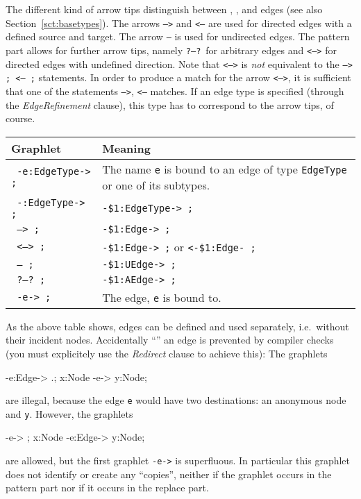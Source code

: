 The different kind of arrow tips distinguish between , , and  edges (see also Section~\ref{sct:basetypes}).
The arrows \texttt{-->} and \texttt{<--} are used for directed edges with a defined source and target.
The arrow \texttt{--} is used for undirected edges.
The pattern part allows for further arrow tips, namely \texttt{?--?}\ for arbitrary edges and \texttt{<-->} for directed edges with undefined direction.
Note that \texttt{<-->} is \emph{not} equivalent to the \texttt{--> ; <-- ;} statements.
In order to produce a match for the arrow \texttt{<-->}, it is sufficient that one of the statements \texttt{-->}, \texttt{<--} matches.
If an edge type is specified (through the \emph{EdgeRefinement} clause), this type has to correspond to the arrow tips, of course.
\begin{center}
	\begin{tabularx}{\linewidth}{lX}
		\textbf{Graphlet} & \textbf{Meaning}\\ \hline
		\texttt{ -e:EdgeType-> ;} & The name \texttt{e} is bound to an edge of type \texttt{EdgeType} or one of its subtypes. \\
		\texttt{ -:EdgeType-> ;} & \texttt{-\$1:EdgeType-> ;} \\
		\texttt{ --> ;} & \texttt{-\$1:Edge-> ;} \\
		\texttt{ <--> ;} & \texttt{-\$1:Edge-> ;} or  \texttt{<-\$1:Edge- ;}\\
		\texttt{ -- ;} & \texttt{-\$1:UEdge-> ;} \\
		\texttt{ ?--?\ ;} & \texttt{-\$1:AEdge-> ;} \\
		\texttt{ -e-> ;} & The edge, \texttt{e} is bound to.
	\end{tabularx}
\end{center}
As the above table shows, edges can be defined and used separately, i.e.\ without their incident nodes.
Accidentally ``'' an edge is prevented by compiler checks (you must explicitely use the \emph{Redirect} clause to achieve this):
The graphlets
\begin{grgenlet}
-e:Edge-> .;
x:Node -e-> y:Node;
\end{grgenlet}
are illegal, because the edge \texttt{e} would have two destinations: an anonymous node and \texttt{y}.
However, the graphlets
\begin{grgenlet}
-e-> ;
x:Node -e:Edge-> y:Node;
\end{grgenlet}
are allowed, but the first graphlet \texttt{-e->} is superfluous. In particular this graphlet does not identify or create any ``copies'', neither if the graphlet occurs in the pattern part nor if it occurs in the replace part.
